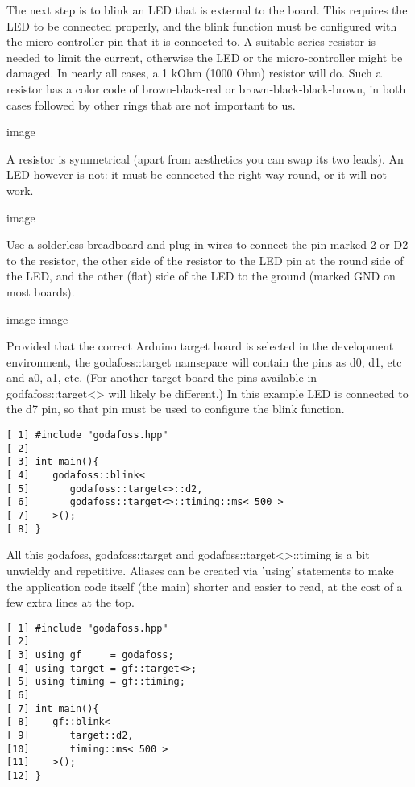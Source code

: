 \documentclass{article}
\begin{document}
The next step is to blink an LED that is external to the board.
This requires the LED to be connected properly, and 
the blink function must be configured with the micro-controller
pin that it is connected to. 
A suitable series resistor is needed to limit the current,
otherwise the LED or the micro-controller might be damaged.
In nearly all cases, a 1 kOhm (1000 Ohm) resistor will do.
Such a resistor has a color code of brown-black-red 
or brown-black-black-brown,
in both cases followed by other rings that are not important to us.

image

A resistor is symmetrical (apart from aesthetics you can swap its two leads).
An LED however is not: it must be connected the right way round, 
or it will not work.

image

Use a solderless breadboard and plug-in wires to connect 
the pin marked 2 or D2 to the resistor, 
the other side of the resistor to the LED pin at the round side
of the LED, and the other (flat) side of the LED to the ground 
(marked GND on most boards).

image
image

Provided that the correct Arduino target board is selected in the 
development environment, the godafoss::target namsepace will contain
the pins as d0, d1, etc and a0, a1, etc.
(For another target board the pins available in godfafoss::target<>
will likely be different.)
In this example LED is connected to the d7 pin, 
so that pin must be used to configure the blink function.

\lstset {language=C++}
\begin{lstlisting}
[ 1] #include "godafoss.hpp"
[ 2] 
[ 3] int main(){
[ 4]    godafoss::blink< 
[ 5]       godafoss::target<>::d2, 
[ 6]       godafoss::target<>::timing::ms< 500 > 
[ 7]    >();
[ 8] }
\end{lstlisting}

All this godafoss, godafoss::target and godafoss::target<>::timing
is a bit unwieldy and repetitive.
Aliases can be created via 'using' statements to make the application 
code itself (the main) shorter and easier to read, at the cost of 
a few extra lines at the top.

\lstset {language=C++}
\begin{lstlisting}
[ 1] #include "godafoss.hpp"
[ 2] 
[ 3] using gf     = godafoss;
[ 4] using target = gf::target<>;
[ 5] using timing = gf::timing;
[ 6] 
[ 7] int main(){
[ 8]    gf::blink< 
[ 9]       target::d2, 
[10]       timing::ms< 500 > 
[11]    >();
[12] }
\end{lstlisting}
\end{document}
